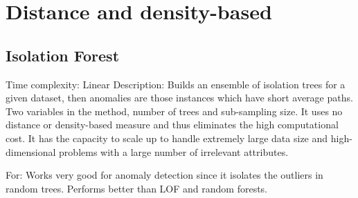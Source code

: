 
\section{Distance and density-based}

\subsection{Isolation Forest}
Time complexity: Linear
Description: Builds an ensemble of isolation trees for a given dataset, then anomalies are those instances which have short average paths. Two variables in the method, number of trees and sub-sampling size. It uses no distance or density-based measure and thus eliminates the high computational cost. It has the capacity to scale up to handle extremely large data size and high-dimensional problems with a large number of irrelevant attributes.

For: Works very good for anomaly detection since it isolates the outliers in random trees. Performs better than LOF and random forests.
